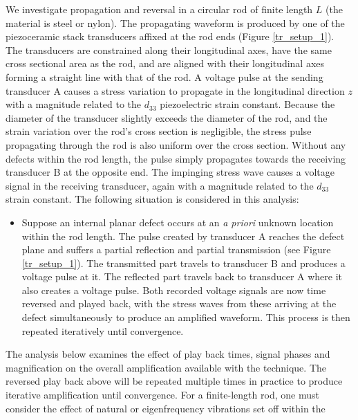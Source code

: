 \documentclass[11pt,letterpaper]{article}%
\begin{document}
We investigate propagation and reversal in a circular rod of
finite length $L$ (the material is steel or nylon). The
propagating waveform is produced by one of the piezoceramic stack
transducers affixed at the rod ends (Figure \ref{tr_setup_1}). The transducers are constrained along their
longitudinal axes, have the same cross sectional area as the rod,
and are aligned with their longitudinal axes forming a straight
line with that of the rod.  A voltage pulse at the sending
transducer  A causes a stress variation to propagate in the
longitudinal direction $z$ with a magnitude related to the
$d_{33}$ piezoelectric strain constant. Because the diameter of
the transducer slightly exceeds the diameter of the rod, and the
strain variation over the rod's cross section is negligible, the
stress pulse propagating through the rod is also uniform over the
cross section.  Without any defects within the rod length, the
pulse simply propagates towards the receiving transducer B at the
opposite end. The impinging stress wave causes a voltage signal in
the receiving transducer, again with a magnitude related to the
$d_{33}$ strain constant. The following situation is considered in
this analysis:
\begin{itemize}
\item Suppose an internal planar defect occurs at an {\em a
priori} unknown location within the rod length. The pulse created
by transducer A reaches the defect plane and suffers a partial
reflection and partial transmission (see Figure \ref{tr_setup_1}).
The transmitted part travels to transducer B and produces a
voltage pulse at it. The reflected part travels back to transducer
A where it also creates a voltage pulse.  Both recorded voltage
signals are now time reversed and played back, with the stress
waves from these arriving at the defect simultaneously to produce
an amplified waveform.  This process is then repeated iteratively
until convergence.
\end{itemize}
The analysis below examines the effect of play back times, signal
phases and magnification on the overall amplification available
with the technique.  The reversed play back above will be repeated
multiple times in practice to produce iterative amplification
until convergence. For a finite-length rod, one must consider the
effect of natural or eigenfrequency vibrations set off within the
\end{document}
